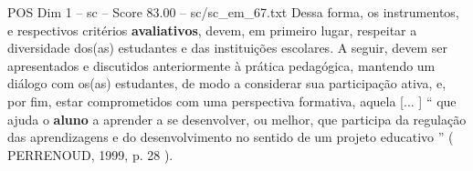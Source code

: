 \begin{textsample}{POS Dim 1 – sc – Score 83.00 – sc/sc\_em\_67.txt}
Dessa forma, os instrumentos, e respectivos critérios \textbf{avaliativos}, devem, em primeiro lugar, respeitar a diversidade dos(as) estudantes e das instituições escolares.
A seguir, devem ser apresentados e discutidos anteriormente à prática pedagógica, mantendo um diálogo com os(as) estudantes, de modo a considerar sua participação ativa, e, por fim, estar comprometidos com uma perspectiva formativa, aquela [... ] “ que ajuda o \textbf{aluno} a aprender a se desenvolver, ou melhor, que participa da regulação das aprendizagens e do desenvolvimento no sentido de um projeto educativo ” ( PERRENOUD, 1999, p. 28 ).

\end{textsample}
